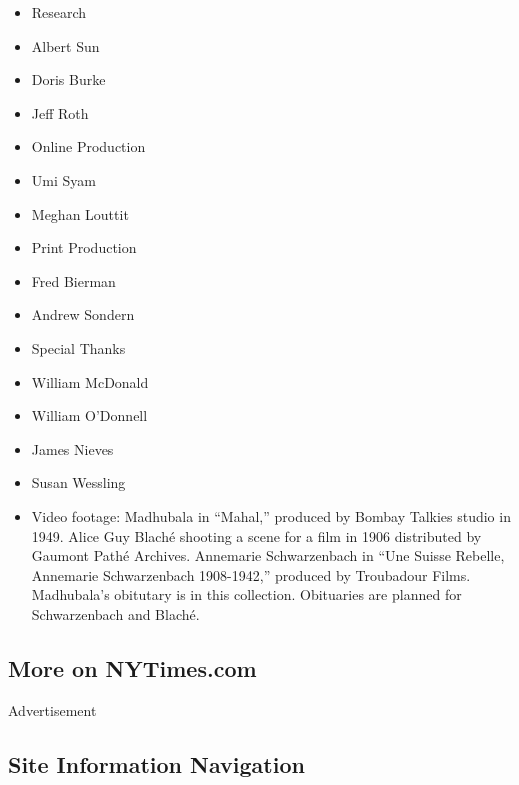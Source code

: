 \begin{itemize}
\tightlist
\item
  Research
\item
  Albert Sun
\item
  Doris Burke
\item
  Jeff Roth
\end{itemize}

\begin{itemize}
\tightlist
\item
  Online Production
\item
  Umi Syam
\item
  Meghan Louttit
\end{itemize}

\begin{itemize}
\tightlist
\item
  Print Production
\item
  Fred Bierman
\item
  Andrew Sondern
\end{itemize}

\begin{itemize}
\tightlist
\item
  Special Thanks
\item
  William McDonald
\item
  William O'Donnell
\item
  James Nieves
\item
  Susan Wessling
\end{itemize}

\begin{itemize}
\tightlist
\item
  Video footage: Madhubala in ``Mahal,'' produced by Bombay Talkies
  studio in 1949. Alice Guy Blaché shooting a scene for a film in 1906
  distributed by Gaumont Pathé Archives. Annemarie Schwarzenbach in
  ``Une Suisse Rebelle, Annemarie Schwarzenbach 1908-1942,'' produced by
  Troubadour Films. Madhubala's obitutary is in this collection.
  Obituaries are planned for Schwarzenbach and Blaché.
\end{itemize}

\hypertarget{more-on-nytimescom}{%
\subsection{More on NYTimes.com}\label{more-on-nytimescom}}

Advertisement

\hypertarget{site-information-navigation}{%
\subsection{Site Information
Navigation}\label{site-information-navigation}}

